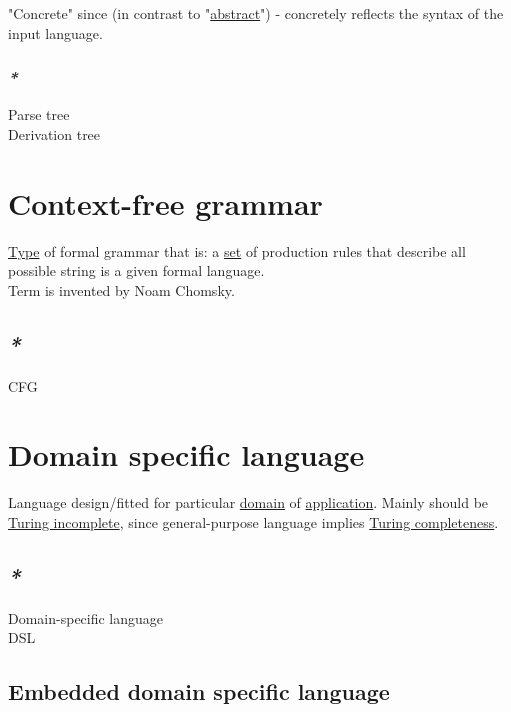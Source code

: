 \documentclass[a4paper,14pt,oneside]{book}
\begin{document}
"Concrete" since (in contrast to "\hyperref[org9c8391a]{abstract}") - concretely reflects the syntax of the input language.\\

\subsection{\emph{*}}
\label{sec:org4ae3897}

\label{orgb5a4dbd}Parse tree\\
\label{orge06cd81}Derivation tree\\

\chapter{\label{org0d2db7c}Context-free grammar}
\label{sec:orgbfd14fb}
\hyperref[orgc4a7610]{Type} of formal grammar that is: a \hyperref[org0f7f8fa]{set} of production rules that describe all possible string is a given formal language.\\

Term is invented by Noam Chomsky.\\

\section{\emph{*}}
\label{sec:org12fbb3a}

\label{orgb8e2019}CFG\\

\chapter{\label{org3a7d3c9}Domain specific language}
\label{sec:org984aa25}
Language design/fitted for particular \hyperref[orge94fc58]{domain} of \hyperref[orgf09110d]{application}. Mainly should be \hyperref[orgab9bf82]{Turing incomplete}, since general-purpose language implies \hyperref[orgc473fde]{Turing completeness}.\\

\section{\emph{*}}
\label{sec:org5a3ff9d}

\label{org72fac9e}Domain-specific language\\
\label{org6b223c3}DSL\\

\section{\label{orgda45be8}Embedded domain specific language}
\label{sec:orgf64743e}
\end{document}

